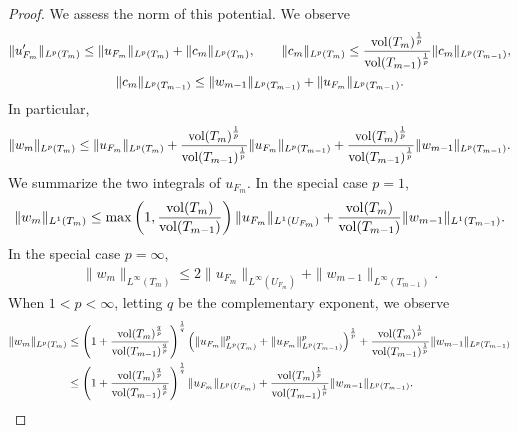 \documentclass[a4paper]{article}
\begin{document}
\begin{proof}
 We assess the norm of this potential. We observe 
 \begin{gather*}
    \| u'_{F_m} \|_{L^{p}(T_m)}
    \leq 
    \| u_{F_m} \|_{L^{p}(T_m)}
    +
    \| c_{m} \|_{L^{p}(T_m)},
    \qquad 
    \| c_{m} \|_{L^{p}(T_m)}
    \leq 
    \frac{ \operatorname{vol}(T_m)^{\frac 1 p} }{ \operatorname{vol}(T_{{m-1}})^{\frac 1 p} }
    \| c_{m} \|_{L^{p}(T_{{m-1}})},
    \\ 
    \| c_{m} \|_{L^{p}(T_{{m-1}})}
    \leq 
    \| w_{m-1}\|_{L^{p}(T_{{m-1}})} + \| u_{F_{m}} \|_{L^{p}(T_{{m-1}})} 
    .
 \end{gather*}
 In particular,
 \begin{align*}
    \| w_{m} \|_{L^{p}(T_m)}
    \leq 
    \| u_{F_m} \|_{L^{p}(T_m)}
    +
    \frac{ \operatorname{vol}(T_m)^{\frac 1 p} }{ \operatorname{vol}(T_{{m-1}})^{\frac 1 p} }
    \| u_{F_{m}} \|_{L^{p}(T_{{m-1}})}
    +
    \frac{ \operatorname{vol}(T_m)^{\frac 1 p} }{ \operatorname{vol}(T_{{m-1}})^{\frac 1 p} }
    \| w_{m-1}\|_{L^{p}(T_{{m-1}})}
    .
 \end{align*}
 We summarize the two integrals of $u_{F_m}$. 
 In the special case $p=1$,
 \begin{align*}
    \| w_{m} \|_{L^{1}(T_m)}
    \leq 
    \max\left(
        1, \frac{ \operatorname{vol}(T_m) }{ \operatorname{vol}(T_{{m-1}}) } 
    \right)
    \| u_{F_m} \|_{L^{1}(U_{F_m})}
    +
    \frac{ \operatorname{vol}(T_m) }{ \operatorname{vol}(T_{{m-1}}) }
    \| w_{m-1}\|_{L^{1}(T_{{m-1}})}
    .
 \end{align*}
 In the special case $p=\infty$, 
 \begin{align*}
    \| w_{m} \|_{L^{\infty}(T_m)}
    \leq 
    2
    \| u_{F_m} \|_{L^{\infty}(U_{F_m})}
    +
    \| w_{m-1}\|_{L^{\infty}(T_{{m-1}})}
    .
 \end{align*}
 When $1 < p < \infty$, letting $q$ be the complementary exponent, we observe 
 \begin{align*}
    \| w_{m} \|_{L^{p}(T_m)}
    &\leq 
    \left( 1 + \frac{ \operatorname{vol}(T_m)^{\frac q p} }{ \operatorname{vol}(T_{{m-1}})^{\frac q p} } \right)^{\frac 1 q}
    \left( 
        \| u_{F_m} \|_{L^{p}(T_m)}^{p}
        +
        \| u_{F_{m}} \|_{L^{p}(T_{{m-1}})}^{p}
    \right)^{\frac 1 p}
    +
    \frac{ \operatorname{vol}(T_m)^{\frac 1 p} }{ \operatorname{vol}(T_{{m-1}})^{\frac 1 p} }
    \| w_{m-1}\|_{L^{p}(T_{{m-1}})}
    \\&\leq 
    \left( 1 + \frac{ \operatorname{vol}(T_m)^{\frac q p} }{ \operatorname{vol}(T_{{m-1}})^{\frac q p} } \right)^{\frac 1 q}
    \| u_{F_m} \|_{L^{p}(U_{F_m})} 
    +
    \frac{ \operatorname{vol}(T_m)^{\frac 1 p} }{ \operatorname{vol}(T_{{m-1}})^{\frac 1 p} }
    \| w_{m-1}\|_{L^{p}(T_{{m-1}})}
    .
 \end{align*}

\end{proof}
\end{document}
